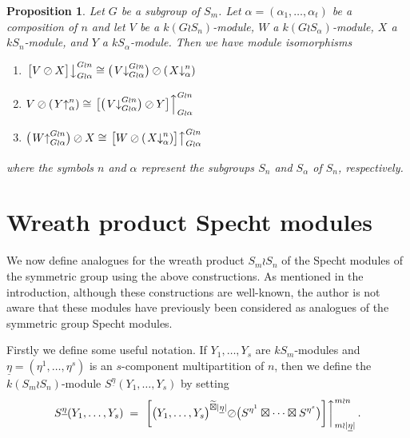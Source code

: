 \documentclass[10pt]{article}
\newtheorem{prop}[theorem]{Proposition}
\theoremstyle{definition}
\newcommand{\ul}[1]{\underline{#1}}
\begin{document}
\begin{prop}\label{wreath_ind_res:prop}\cite[Lemma 3.2]{CHTAN}
Let $G$ be a subgroup of $S_m$.
Let $\alpha = (\alpha_1,\ldots,\alpha_t)$ be a composition of $n$ and let $V$ be a $k(G{\wr}S_n)$-module, $W$ a
$k(G{\wr}S_\alpha)$-module, $X$ a $kS_n$-module, and $Y$ a $kS_\alpha$-module. Then we have module isomorphisms
\begin{enumerate}
\item $\left.\bigl[V \oslash X\bigr]\right\downarrow^{G{\wr}n}_{G{\wr}\alpha} \cong
\bigl(\left.V\right\downarrow^{G{\wr}n}_{G{\wr}\alpha}\bigr) \oslash \left(\left.X\right\downarrow^{n}_{\alpha}\right)$
\item $V \oslash \left(\left.Y\right\uparrow^{n}_{\alpha}\right)
\cong \left.\bigl[\bigl(\left.V\right\downarrow^{G{\wr}n}_{G{\wr}\alpha}\bigr) \oslash Y\bigr]\right\uparrow^{G{\wr}n}_{G{\wr}\alpha}$
\item $\bigl(\left.W\right\uparrow^{G{\wr}n}_{G{\wr}\alpha}\bigr) \oslash X
\cong \left.\bigl[W \oslash \left(\left.X\right\downarrow^{n}_{\alpha}\right)\bigr]\right\uparrow^{G{\wr}n}_{G{\wr}\alpha}$
\end{enumerate}
where the symbols $n$ and $\alpha$ represent the subgroups $S_n$ and $S_\alpha$ of $S_n$, respectively.
\end{prop}

\section{Wreath product Specht modules}
We now define analogues for the wreath product $S_m \wr S_n$ of the Specht modules of the symmetric group using the above constructions.
As mentioned in the introduction, although these constructions are well-known, the author is not aware that these modules have
previously been considered as analogues of the symmetric group Specht modules.

Firstly we define some useful notation. If $Y_1,\ldots,Y_s$ are $kS_m$-modules and $\ul{\eta} = (\eta^1,\ldots,\eta^s)$ is an
$s$-component multipartition of $n$, then we define the $k(S_m{\wr}S_n)$-module $S^{\ul{\eta}}(Y_1,\ldots,Y_s)$ by setting
\[
S^{\ul{\eta}}(Y_1,\ldots,Y_s)\;=\; \left.\left[\bigl(Y_1,\ldots,Y_s\bigr)^{\widetilde\boxtimes |\ul{\eta}|}{\oslash}
\bigl(S^{\eta^1}\boxtimes\cdots\boxtimes S^{\eta^s}\bigr)\right]\right\uparrow^{m{\wr}n}_{m{\wr}|\ul{\eta}|}.
\]
\end{document}
